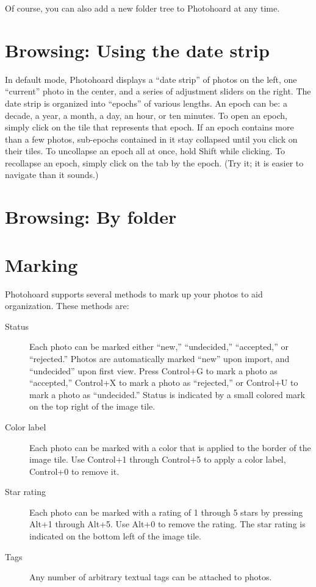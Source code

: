 \documentclass[11pt]{report}
\begin{document}
Of course, you can also add a new folder tree to Photohoard at any
time.

\section{Browsing: Using the date strip}

In default mode, Photohoard displays a ``date strip'' of photos on the left,
one ``current'' photo in the center, and a series of adjustment
sliders on the right. The date strip is organized into ``epochs'' of
various lengths. An epoch can be: a decade, a year, a month, a day, an
hour, or ten minutes. To open an epoch, simply click on the tile  that
represents that epoch. If an epoch contains more than a few photos,
sub-epochs contained in it stay collapsed until you click on their
tiles. To uncollapse an epoch all at once, hold Shift while
clicking. To recollapse an epoch, simply click on the tab by the
epoch. (Try it; it is easier to navigate than it sounds.)

\section{Browsing: By folder}



\section{Marking}

Photohoard supports several methods to mark up your photos to aid
organization. These methods are:
\begin{description}
  \item[Status]Each photo can be marked either ``new,'' ``undecided,''
    ``accepted,'' or ``rejected.'' Photos are automatically marked
    ``new'' upon import, and ``undecided'' upon first view. Press
    Control+G to mark a photo as ``accepted,'' Control+X to mark a
    photo as ``rejected,'' or Control+U to mark a photo as
    ``undecided.'' Status is indicated by a small colored mark on the
    top right of the image tile.
  \item[Color label]Each photo can be marked with a color that is
    applied to the border of the image tile. Use Control+1 through
    Control+5 to apply a color label, Control+0 to remove it.
  \item[Star rating]Each photo can be marked with a rating of 1
    through 5 stars by pressing Alt+1 through Alt+5. Use Alt+0 to
    remove the rating.
    The star rating is indicated on the bottom left of the image tile.
  \item[Tags]Any number of arbitrary textual tags can be attached to photos.
\end{description}
\end{document}
